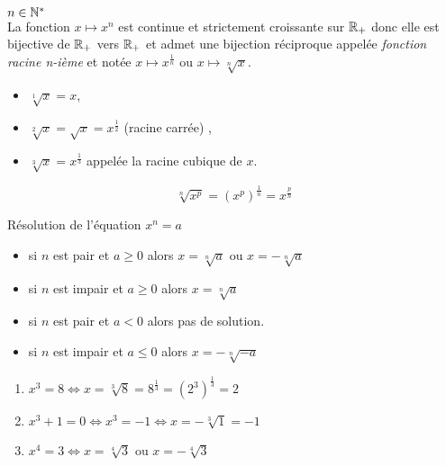 
\everymath{\displaystyle}

 \summary{}
   \begin{theorem}[et définition]
   
$ n\in \mathbb{N}^* $\\
La fonction $x\mapsto x^{n} $  est continue et strictement croissante sur $ \mathbb{R}_+ $  donc elle est bijective de $ \mathbb{R}_+ $ vers $ \mathbb{R}_+ $ et admet une bijection réciproque appelée \emph{fonction racine n-ième} et notée  $x\mapsto x^{\frac{1}{n}} $ ou $ x\mapsto \sqrt[n]{x} $.
\end{theorem}
\begin{example}
\begin{itemize}
\item $ \sqrt[1]{x}=x $,
\item  $ \sqrt[2]{x}=\sqrt{x}=x^{\frac{1}{2}}$\; (racine carrée) ,
\item  $ \sqrt[3]{x} =x^{\frac{1}{3}}$  appelée la racine cubique de $ x. $

\end{itemize}
\end{example}
\begin{notation}
\[\sqrt[n]{x^{p}}= (x^{p})^{\frac{1}{n}}= x^{\frac{p}{n}}\]
\end{notation}

 \colorbox{red!20!}{Résolution de l'équation $ x^{n}=a $}
\begin{itemize}
\item[\textbullet] si $ n $ est pair  et  $ a\geq 0 $ alors $ x= \sqrt[n]{a}$ ou $ x= -\sqrt[n]{a}$
\item[\textbullet] si $ n $ est impair  et  $ a\geq 0 $ alors $ x= \sqrt[n]{a}$
\item[\textbullet] si $ n $ est pair  et  $ a < 0 $ alors pas de solution. 
\item[\textbullet] si $ n $ est impair  et  $ a\leq 0 $ alors  $ x= -\sqrt[n]{-a}$
\end{itemize}

\begin{example}
\begin{enumerate}
\item $ x^3=8 \Longleftrightarrow x=\sqrt[3]{8}= 8^{\frac{1}{3}} = (2^3)^{\frac{1}{3}}=2$
\item $ x^3+1=0\Longleftrightarrow x^3=-1 \Longleftrightarrow x=-\sqrt[3]{1}= -1$
\item $ x^4= 3 \Longleftrightarrow x= \sqrt[4]{3}$ ou $ x= -\sqrt[4]{3} $  
 \end{enumerate}
\end{example}
